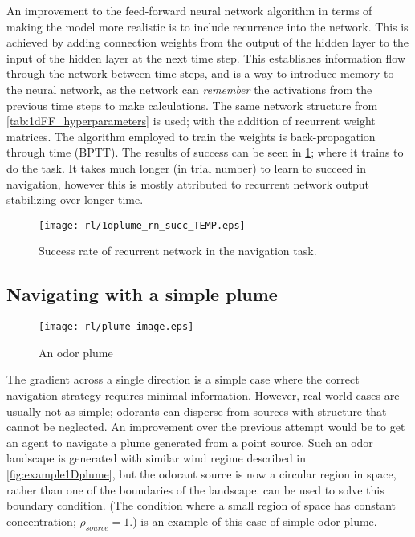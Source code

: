 \documentclass[../dissertation.tex]{subfiles}
\begin{document}
An improvement to the feed-forward neural network algorithm in terms of making the model more realistic is to include recurrence into the network.
This is achieved by adding connection weights from the output of the hidden layer to the input of the hidden layer at the next time step.
This establishes information flow through the network between time steps, and is a way to introduce memory to the neural network, as the network can \textit{remember} the activations from the previous time steps to make calculations.
The same network structure from \cref{tab:1dFF_hyperparameters} is used; with the addition of recurrent weight matrices.
The algorithm employed to train the weights is back-propagation through time (BPTT).
The results of success can be seen in \cref{fig:1dplumeSucRec}; where it trains to do the task.
It takes much longer (in trial number) to learn to succeed in navigation, however this is mostly attributed to recurrent network output stabilizing over longer time.

\begin{figure}[ht]
    \centering
    \texttt{[image: rl/1dplume\_rn\_succ\_TEMP.eps]}
    \caption{Success rate of recurrent network in the navigation task.}
    \label{fig:1dplumeSucRec}
\end{figure}

\subsection{Navigating with a simple plume}

\begin{figure}[ht]
    \centering
    \texttt{[image: rl/plume\_image.eps]}
    \caption{An odor plume}
    \label{fig:2dplume_img}
\end{figure}

The gradient across a single direction is a simple case where the correct navigation strategy requires minimal information.
However, real world cases are usually not as simple; odorants can disperse from sources with structure that cannot be neglected.
An improvement over the previous attempt would be to get an agent to navigate a plume generated from a point source.
Such an odor landscape is generated with similar wind regime described in \cref{fig:example1Dplume}, but the odorant source is now a circular region in space, rather than one of the boundaries of the landscape.
 can be used to solve this boundary condition. 
(The condition where a small region of space has constant concentration; $\rho_{source}=1$.)
 is an example of this case of simple odor plume.
\end{document}
